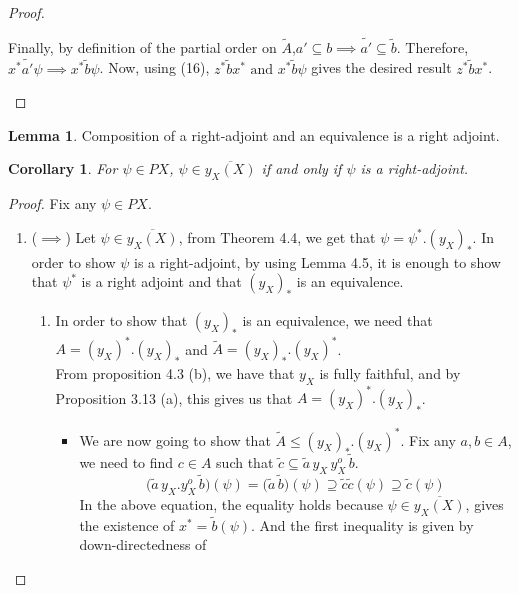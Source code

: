 \documentclass[18pt,a4paper]{article}
\newtheorem{coro}[theorem]{Corollary}
\theoremstyle{definition}
\newtheorem{lemma}[theorem]{Lemma}
\begin{document}
\begin{proof}
\begin{enumerate}[label=(\alph*)]
				Finally, by definition of the partial order on $\tilde{A}$,$a' \subseteq b \implies \tilde{a'}
				\subseteq \tilde{b} $. Therefore,  $x^* \tilde{a'}\psi \implies x^* \tilde{b}\psi$.
				Now, using (16), $z^* \tilde{b}x^* \text{ and } x^*\tilde{b}\psi  $ gives the desired result
				$z^* \tilde{b} x^* $. \qedhere
		\end{enumerate}
	\end{proof}
	\begin{lemma}
		Composition of a right-adjoint and an equivalence is a right adjoint.
	\end{lemma}
	\begin{coro}
		For $\psi \in PX$, $\psi \in \overline{y_X(X)}$ if and only if $\psi$ is a right-adjoint.
	\end{coro}
	\begin{proof}\setcounter{equation}{0}
		Fix any $\psi \in PX$. \setcounter{equation}{0}
		\begin{enumerate}[label=(\roman*)]
			\item ($\implies$)
				Let $\psi \in \overline{y_X(X)}$, from Theorem 4.4, we get that
				$\psi = \psi^*.(y_X^{})_*^{}$. In order to show $\psi$ is a
				right-adjoint, by using Lemma 4.5, it is enough to show that $\psi^*$ is a
				right adjoint and that $(y_X^{})_*^{}$ is an equivalence.
				\begin{enumerate}[label=\Roman*]
					\item In order to show that $(y_X^{})_*^{}$ is an equivalence,
						we need that $A=(y_X^{})^*_{}.(y_X^{})_*$ and
						$\tilde{A}= (y_X^{})_*.(y_X^{})^*_{}$.\\
						From proposition 4.3 (b), we have that $y_X^{}$
						is fully faithful, and by Proposition 3.13 (a), this gives us
						that $A=(y_X^{})^*_{}.(y_X^{})_*$.
						\begin{itemize}
							\item 	We are now going to show that
								$\tilde{A} \leq (y_X^{})_*.(y_X^{})^*$.
								Fix any $a,b\in A$, we need to find $c\in A$
								such that $\tilde{c} \subseteq \tilde{a}\,
								y_X^{} \, y_X^{o} \, \tilde{b} $.
								\[\big(\tilde{a}\, y_X^{}.y_X^{o}\, \tilde{b}\big) (\psi)
									=\big(\tilde{a}\,\tilde{b}\big) (\psi)
									\supseteq \tilde{c} \tilde{c} (\psi)
								\supseteq \tilde{c}(\psi) \]
								In the above equation, the equality holds because $\psi \in \overline{y_X^{}(X)}$, gives
								the existence of $x^*=\tilde{b}(\psi)$. And the first inequality is given by down-directedness of

\end{itemize}
\end{enumerate}
\end{enumerate}
\end{proof}
\end{document}
